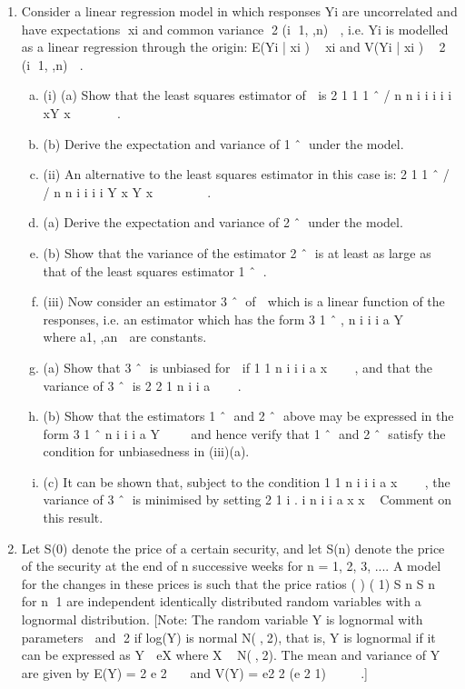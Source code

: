 \documentclass[a4paper,12pt]{article}
\begin{document}
\begin{enumerate}
(a) Calculate the difference (before  after) in contaminant content for
each site, present these differences graphically and comment briefly on
the shape of the distribution.
(b) Perform an appropriate test to investigate whether the modification has
led to a reduction in the contaminant content.
(c) Comment briefly on the validity of this test in the light of your answer
to part (ii)(a). 
\item Consider a linear regression model in which responses Yi are uncorrelated and have
expectations xi and common variance 2 (i 1, ,n)  , i.e. Yi is modelled as a linear
regression through the origin:
E(Yi | xi )  xi and V(Yi | xi )  2 (i 1, ,n)  .
\begin{enumerate}[(a)]
\item (i) (a) Show that the least squares estimator of  is 2
1 1 1
ˆ / n n
i i i i i xY x
 
   .
\item (b) Derive the expectation and variance of 1 ˆ under the model. 
\item (ii) An alternative to the least squares estimator in this case is:
2
1 1
ˆ / /
n n
i i
i i
Y x Y x
 
    .
\item (a) Derive the expectation and variance of 2 ˆ under the model.
\item (b) Show that the variance of the estimator 2 ˆ is at least as large as that of
the least squares estimator 1 ˆ . 
\item (iii) Now consider an estimator 3 ˆ of  which is a linear function of the
responses, i.e. an estimator which has the form 3
1
ˆ ,
n
i i
i
a Y

  where a1, ,an 
are constants.
\item (a) Show that 3 ˆ is unbiased for  if 1 1 n
i i i a x

  , and that the variance
of 3 ˆ is 2 2
1
n
i i a

  .
\item (b) Show that the estimators 1 ˆ and 2 ˆ above may be expressed in the
form 3
1
ˆ
n
i i
i
a Y

  and hence verify that 1 ˆ and 2 ˆ satisfy the
condition for unbiasedness in (iii)(a).
\item (c) It can be shown that, subject to the condition 1 1 n
i i i a x

  , the
variance of 3 ˆ is minimised by setting
2
1
i .
i n
i i
a x
x



Comment on this result. 
\end{enumerate}
\item Let S(0) denote the price of a certain security, and let S(n) denote the price of the
security at the end of n successive weeks for n = 1, 2, 3, .... A model for the changes
in these prices is such that the price ratios ( )
( 1)
S n
S n
for n 1 are independent
identically distributed random variables with a lognormal distribution.
[Note: The random variable Y is lognormal with parameters  and 2 if log(Y) is
normal N(,2), that is, Y is lognormal if it can be expressed as Y  eX where
X ~ N(,2). The mean and variance of Y are given by E(Y) =
2
e 2

 and
V(Y) = e2 2 (e 2 1)  
 .]


\end{enumerate}
\end{document}
